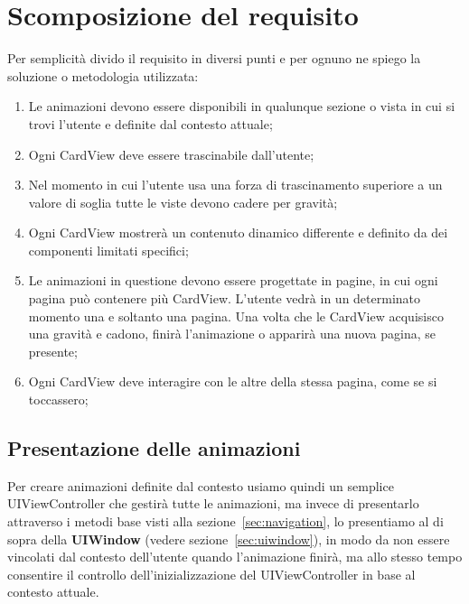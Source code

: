 \section{Scomposizione del requisito}

Per semplicità divido il requisito in diversi punti e per ognuno ne spiego la soluzione
o metodologia utilizzata:

\begin{enumerate}
    \item\label{animationenum:1} Le animazioni devono essere disponibili in qualunque sezione o vista in cui si trovi l'utente e definite dal contesto attuale;

    \item\label{animationenum:2} Ogni CardView deve essere trascinabile dall'utente;
    
    \item\label{animationenum:3} Nel momento in cui l'utente usa una forza di trascinamento superiore a un valore di soglia tutte le viste devono
        cadere per gravità;

    \item\label{animationenum:4} Ogni CardView mostrerà un contenuto dinamico differente e definito da dei componenti
    limitati specifici;

    \item\label{animationenum:5} Le animazioni in questione devono essere progettate in pagine, in cui ogni pagina può contenere 
    più CardView. L'utente vedrà in un determinato momento una e soltanto una pagina. 
    Una volta che le CardView acquisisco una gravità e cadono, finirà l'animazione o apparirà
    una nuova pagina, se presente;

    \item\label{animationenum:7} Ogni CardView deve interagire con le altre della stessa pagina, come se si toccassero;

\end{enumerate}

\subsection{Presentazione delle animazioni}

Per creare animazioni definite dal contesto usiamo quindi un semplice UIViewController che gestirà tutte le animazioni,
ma invece di presentarlo attraverso i metodi base visti alla sezione~\ref{sec:navigation}, lo presentiamo al di sopra della \textbf{UIWindow} (vedere sezione~\ref{sec:uiwindow}),
in modo da non essere vincolati dal contesto dell'utente quando l'animazione finirà, ma allo stesso tempo
consentire il controllo dell'inizializzazione del UIViewController in base al contesto attuale.

